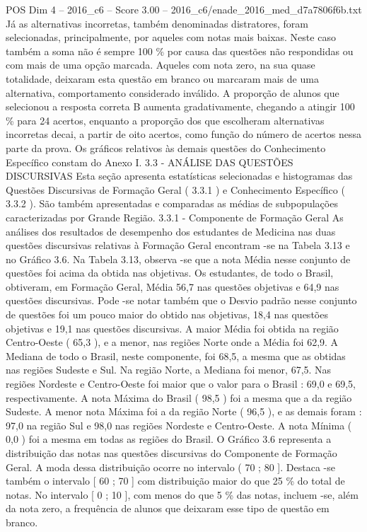 \begin{textsample}{POS Dim 4 – 2016\_c6 – Score 3.00 – 2016\_c6/enade\_2016\_med\_d7a7806f6b.txt}
Já as alternativas incorretas, também denominadas distratores, foram selecionadas, principalmente, por aqueles com notas mais baixas.
Neste caso também a soma não é sempre 100 \% por causa das questões não respondidas ou com mais de uma opção marcada.
Aqueles com nota zero, na sua quase totalidade, deixaram esta questão em branco ou marcaram mais de uma alternativa, comportamento considerado inválido.
A proporção de alunos que selecionou a resposta correta B aumenta gradativamente, chegando a atingir 100 \% para 24 acertos, enquanto a proporção dos que escolheram alternativas incorretas decai, a partir de oito acertos, como função do número de acertos nessa parte da prova.
Os gráficos relativos às demais questões do Conhecimento Específico constam do Anexo I. 3.3 - ANÁLISE DAS QUESTÕES DISCURSIVAS Esta seção apresenta estatísticas selecionadas e histogramas das Questões Discursivas de Formação Geral ( 3.3.1 ) e Conhecimento Específico ( 3.3.2 ).
São também apresentadas e comparadas as médias de subpopulações caracterizadas por Grande Região. 3.3.1 - Componente de Formação Geral As análises dos resultados de desempenho dos estudantes de Medicina nas duas questões discursivas relativas à Formação Geral encontram -se na Tabela 3.13 e no Gráfico 3.6.
Na Tabela 3.13, observa -se que a nota Média nesse conjunto de questões foi acima da obtida nas objetivas.
Os estudantes, de todo o Brasil, obtiveram, em Formação Geral, Média 56,7 nas questões objetivas e 64,9 nas questões discursivas.
Pode -se notar também que o Desvio padrão nesse conjunto de questões foi um pouco maior do obtido nas objetivas, 18,4 nas questões objetivas e 19,1 nas questões discursivas.
A maior Média foi obtida na região Centro-Oeste ( 65,3 ), e a menor, nas regiões Norte onde a Média foi 62,9.
A Mediana de todo o Brasil, neste componente, foi 68,5, a mesma que as obtidas nas regiões Sudeste e Sul.
Na região Norte, a Mediana foi menor, 67,5.
Nas regiões Nordeste e Centro-Oeste foi maior que o valor para o Brasil : 69,0 e 69,5, respectivamente.
A nota Máxima do Brasil ( 98,5 ) foi a mesma que a da região Sudeste.
A menor nota Máxima foi a da região Norte ( 96,5 ), e as demais foram : 97,0 na região Sul e 98,0 nas regiões Nordeste e Centro-Oeste.
A nota Mínima ( 0,0 ) foi a mesma em todas as regiões do Brasil.
O Gráfico 3.6 representa a distribuição das notas nas questões discursivas do Componente de Formação Geral.
A moda dessa distribuição ocorre no intervalo ( 70 ; 80 ].
Destaca -se também o intervalo [ 60 ; 70 ] com distribuição maior do que 25 \% do total de notas.
No intervalo [ 0 ; 10 ], com menos do que 5 \% das notas, incluem -se, além da nota zero, a frequência de alunos que deixaram esse tipo de questão em branco.

\end{textsample}
